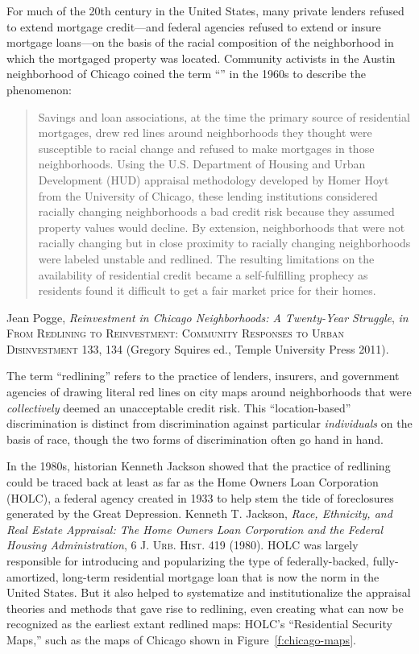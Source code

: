 
For much of the 20th century in the United States, many
private lenders refused to extend mortgage credit---and federal agencies
refused to extend or insure mortgage loans---on the basis of the racial
composition of the neighborhood in which the mortgaged property was located.
Community activists in the Austin neighborhood of Chicago coined the term
``'' in the 1960s to describe the phenomenon:
\begin{quote}
Savings and loan associations, at the time the primary source of residential
mortgages, drew red lines around neighborhoods they thought were susceptible to
racial change and refused to make mortgages in those neighborhoods. Using the
U.S. Department of Housing and Urban Development (HUD) appraisal methodology
developed by Homer Hoyt from the University of Chicago, these lending
institutions considered racially changing neighborhoods a bad credit risk
because they assumed property values would decline. By extension, neighborhoods
that were not racially changing but in close proximity to racially changing
neighborhoods were labeled unstable and redlined. The resulting limitations on
the availability of residential credit became a self-fulfilling prophecy as
residents found it difficult to get a fair market price for their homes.
\end{quote}
Jean Pogge, \textit{Reinvestment in Chicago Neighborhoods: A Twenty-Year
Struggle}, \textit{in} \textsc{From Redlining to Reinvestment: Community
Responses to Urban Disinvestment} 133, 134 (Gregory Squires ed., Temple
University Press 2011). 

The term ``redlining'' refers to the practice of lenders, insurers, and
government agencies of drawing literal red lines on city maps around
neighborhoods that were \textit{collectively} deemed an unacceptable credit
risk. This ``location-based'' discrimination is distinct from discrimination
against particular \textit{individuals} on the basis of race, though the two
forms of discrimination often go hand in hand.

In the 1980s, historian Kenneth Jackson showed that the practice of redlining
could be traced back at least as far as the Home Owners Loan Corporation
(HOLC), a federal agency created in 1933 to help stem the tide of foreclosures
generated by the Great Depression. Kenneth T. Jackson, \textit{Race, Ethnicity,
and Real Estate Appraisal: The Home Owners Loan Corporation and the Federal
Housing Administration}, 6 \textsc{J. Urb. Hist.} 419 (1980). HOLC was largely
responsible for introducing and popularizing the type of federally-backed,
fully-amortized, long-term residential mortgage loan that is now the norm in
the United States. But it also helped to systematize and institutionalize the
appraisal theories and methods that gave rise to redlining, even creating what
can now be recognized as the earliest extant redlined maps: HOLC's
``Residential Security Maps,'' such as the maps of Chicago shown in
Figure~\ref{f:chicago-maps}.

